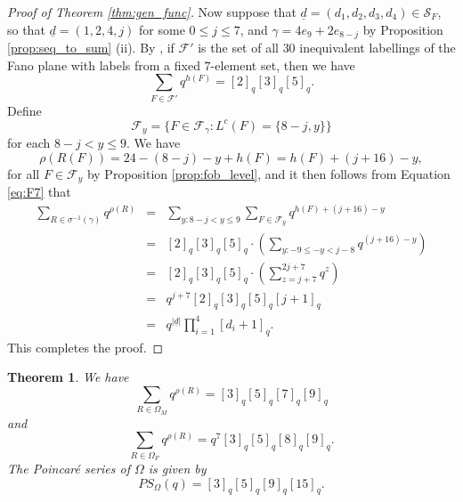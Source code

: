 \documentclass[10pt,a4paper]{amsart}
\newtheorem{theorem}{Theorem}[section]
\numberwithin{equation}{section}
\newcommand{\lc}{L^c}
\newcommand{\seqd}{\underline{d}}
\newcommand{\calf}{\mathcal{F}}
\newcommand{\cals}{\mathcal{S}}
\newcommand{\ob}{\Omega}
\newcommand{\fob}{\Omega_F}
\newcommand{\mob}{\Omega_M}
\newcommand{\inverse}{^{-1}}
\newcommand{\abs}[1]{\lvert #1 \rvert}
\begin{document}
\begin{proof}[Proof of Theorem \ref{thm:gen_func}]
Now suppose that $\seqd=(d_1,d_2,d_3,d_4)\in \cals_F$, so that $\seqd=(1,2,4,j)$ for some
$0\le j\le 7$, and $\gamma=4e_9+2e_{8-j}$ by Proposition \ref{prop:seq_to_sum}
(ii). By \cite[Proposition 3.7, Proposition 4.12]{the240}, if $\calf'$ is the
set of all $30$ inequivalent labellings of the Fano plane with labels from a
fixed $7$-element set, then we have 
\begin{equation}
\label{eq:F7}
\sum_{F \in \calf'} q^{h(F)} = [2]_q [3]_q [5]_q.
\end{equation}
Define
\[
  \calf_y=\{F\in \calf_\gamma: \lc(F)=\{8-j,y\}\}
\]
for each $8-j<y\le 9$. We have
\[
\rho(R(F))=24-(8-j)-y+h(F)=h(F)+(j+16)-y,
\]
for all $F\in \calf_y$
by Proposition \ref{prop:fob_level}, and it then follows from Equation \eqref{eq:F7} that 
\begin{eqnarray*}
  \sum_{R\in \sigma\inverse(\gamma)}q^{\rho(R)}&=& \sum_{y:8-j<y\le 9}\sum_{F\in
  \calf_y}q^{h(F)+(j+16)-y}\\  
                                               &=& [2]_q [3]_q [5]_q\cdot \left(\sum_{y:-9\le -y< {j-8}}
  q^{(j+16)-y}\right)\\
                  &=& [2]_q [3]_q [5]_q\cdot  \left(\sum_{z=j+7}^{2j+7} q^{z}\right) \\ &= &q^{j+7}
[2]_q [3]_q [5]_q [j+1]_q\\ & = & q^{\abs{\seqd}}\prod_{i=1}^4 [d_i+1]_q.
\end{eqnarray*} 
This completes the proof. \end{proof}

\begin{theorem}
\label{thm:endgame}
We have
\begin{equation}
\label{eq:mob_gen}
\sum_{R\in \mob}q^{\rho(R)}=[3]_q[5]_q[7]_q[9]_q
\end{equation}
and 
\begin{equation}
\label{eq:fob_gen}
\sum_{R\in \fob}q^{\rho(R)}=q^7[3]_q[5]_q[8]_q[9]_q.
\end{equation}
The Poincar\'e series of $\ob$ is given by 
\[
PS_\ob(q)=[3]_q[5]_q[9]_q[15]_q.
\]
\end{theorem}
\end{document}
